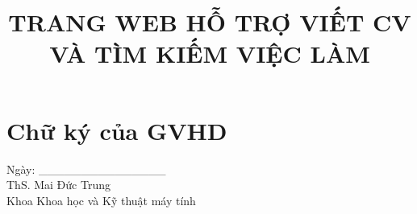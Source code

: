 \documentclass[12pt,a4paper,oneside]{book} %
\title{TRANG WEB HỖ TRỢ VIẾT CV VÀ TÌM KIẾM VIỆC LÀM}
\begin{document}

\coverpage

\frontmatter









\section*{\LARGE Chữ ký của GVHD}
\thispagestyle{empty}
\fontsize{15}{25}\selectfont


\vspace{2.25cm}
\noindent \underline{\hspace{10cm}} Ngày: _______________\\
ThS. Mai Đức Trung\\
Khoa Khoa học và Kỹ thuật máy tính
\end{document}
